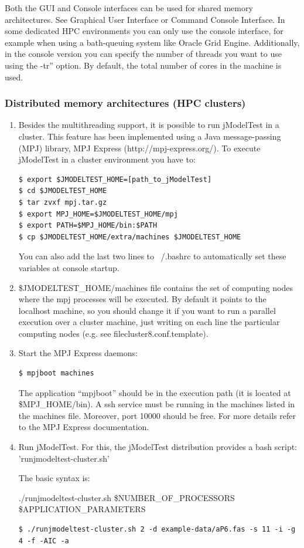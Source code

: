 Both the GUI and Console interfaces can be used for shared memory architectures. See Graphical User Interface or Command Console Interface. In some dedicated HPC environments you can only use the console interface, for example when using a bath-queuing system like Oracle Grid Engine. Additionally, in the console version you can specify the number of threads you want to use using the -tr'' option. By default, the total number of cores in the machine is used.

\subsubsection{Distributed memory architectures (HPC clusters)}

\begin{enumerate}
\item Besides the multithreading support, it is possible to run jModelTest in a cluster. This feature has been implemented using a Java message-passing (MPJ) library, MPJ Express (http://mpj-express.org/). To execute jModelTest in a cluster environment you have to:

\begin{lstlisting}
$ export $JMODELTEST_HOME=[path_to_jModelTest]
$ cd $JMODELTEST_HOME
$ tar zvxf mpj.tar.gz
$ export MPJ_HOME=$JMODELTEST_HOME/mpj
$ export PATH=$MPJ_HOME/bin:$PATH
$ cp $JMODELTEST_HOME/extra/machines $JMODELTEST_HOME
\end{lstlisting}

You can also add the last two lines to ~/.bashrc to automatically set these variables at console startup.

\item \$JMODELTEST\_HOME/machines file contains the set of computing nodes where the mpj processes will be executed. By default it points to the localhost machine, so you should change it if you want to run a parallel execution over a cluster machine, just writing on each line the particular computing nodes (e.g. see filecluster8.conf.template).

\item Start the MPJ Express daemons:

\begin{lstlisting}
$ mpjboot machines
\end{lstlisting}

The application ``mpjboot'' should be in the execution path (it is located at \$MPJ\_HOME/bin). A ssh service must be running in the machines listed in the machines file. Moreover, port 10000 should be free. For more details refer to the MPJ Express documentation.

\item Run jModelTest. For this, the jModelTest distribution provides a bash script: 'runjmodeltest-cluster.sh'

The basic syntax is:

./runjmodeltest-cluster.sh \$NUMBER\_OF\_PROCESSORS \$APPLICATION\_PARAMETERS

\begin{lstlisting}
$ ./runjmodeltest-cluster.sh 2 -d example-data/aP6.fas -s 11 -i -g 4 -f -AIC -a
\end{lstlisting}

\end{enumerate}
